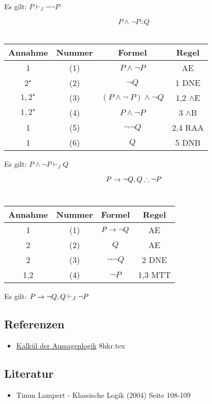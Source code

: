 \documentclass{sajzk}
\begin{document}
Es gilt: $P \vdash_J \lnot\lnot P$
\newpage
\begin{center}
    \[P \land\lnot P\therefore Q \] \\
\begin{tabular}{|c|c|c|c|}
  \hline
  Annahme            & Nummer & Formel                          & Regel \\
  \hline
  1                  & (1)    & $P\land\lnot P$                 & AE \\
  \hline
  $2^\star$          & (2)    & $\lnot Q$                       & 1 DNE \\
  \hline
  $1,2^\star$        & (3)    & $(P\land\lnot\ P)\land \lnot Q$ & 1,2 $\land$E \\
  \hline
  $1,2^\star$        & (4)    & $P\land\lnot P$           & 3 $\land$B \\
  \hline
  1                  & (5)    & $\lnot\lnot Q$            & 2,4 RAA \\
  \hline
  1                  & (6)    & $Q$                       & 5 DNB \\
  \hline
\end{tabular}
\end{center}
Es gilt: $P \land\lnot P \vdash_J Q$
\begin{center}
    \[P \rightarrow\lnot Q, Q\therefore \lnot P \] \\
\begin{tabular}{|c|c|c|c|}
  \hline
  Annahme            & Nummer & Formel                    & Regel \\
  \hline
  1                  & (1)    & $P\rightarrow\lnot Q$             & AE \\
  \hline
  2                  & (2)    & $Q$                       & AE \\
  \hline
  2                  & (3)    & $\lnot\lnot Q$            & 2 DNE \\
  \hline
  1,2                & (4)    & $\lnot P$                 & 1,3 MTT \\
  \hline
\end{tabular}
\end{center}
Es gilt: $P \rightarrow\lnot Q, Q \vdash_J \lnot P$
\subsection{Referenzen}
\begin{itemize}
    \item \href{8hkr.pdf}{Kalkül der Aussagenlogik} 8hkr.tex
\end{itemize}

\subsection{Literatur}
\begin{itemize}
    \item Timm Lampert - Klassische Logik (2004) Seite 108-109
\end{itemize}
\end{document}
